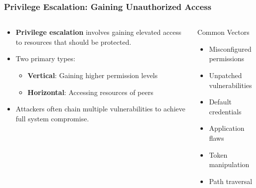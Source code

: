 \documentclass{beamer}
\begin{document}
\begin{frame}
    \frametitle{Privilege Escalation: Gaining Unauthorized Access}
    
    \begin{columns}
        \begin{column}{0.5\textwidth}
            \begin{itemize}
                \item \textbf{Privilege escalation} involves gaining elevated access to resources that should be protected.
                \item Two primary types:
                    \begin{itemize}
                        \item \textbf{Vertical}: Gaining higher permission levels
                        \item \textbf{Horizontal}: Accessing resources of peers
                    \end{itemize}
                \item Attackers often chain multiple vulnerabilities to achieve full system compromise.
            \end{itemize}
        \end{column}
        \begin{column}{0.5\textwidth}
            \begin{block}{Common Vectors}
                \begin{itemize}
                    \item Misconfigured permissions
                    \item Unpatched vulnerabilities
                    \item Default credentials
                    \item Application flaws
                    \item Token manipulation
                    \item Path traversal
                \end{itemize}
            \end{block}
        \end{column}
    \end{columns}

\end{frame}
\end{document}
